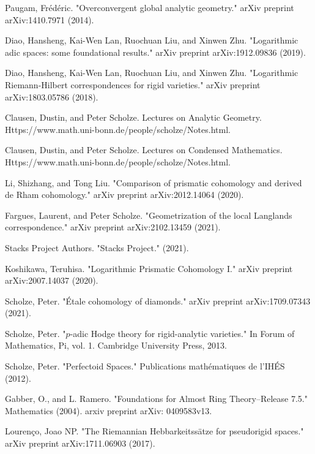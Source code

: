 \documentclass[11pt]{book}
\theoremstyle{definition}
\numberwithin{equation}{section}
\begin{document}
\begin{thebibliography}{10}
 Paugam, Fr\'ed\'eric. "Overconvergent global analytic geometry." arXiv preprint arXiv:1410.7971 (2014).


 Diao, Hansheng, Kai-Wen Lan, Ruochuan Liu, and Xinwen Zhu. "Logarithmic adic spaces: some foundational results." arXiv preprint arXiv:1912.09836 (2019).

 Diao, Hansheng, Kai-Wen Lan, Ruochuan Liu, and Xinwen Zhu. "Logarithmic Riemann-Hilbert correspondences for rigid varieties." arXiv preprint arXiv:1803.05786 (2018).


 Clausen, Dustin, and Peter Scholze. Lectures on Analytic Geometry. Https://www.math.uni-bonn.de/people/scholze/Notes.html.

 Clausen, Dustin, and Peter Scholze. Lectures on Condensed Mathematics. Https://www.math.uni-bonn.de/people/scholze/Notes.html.






 Li, Shizhang, and Tong Liu. "Comparison of prismatic cohomology and derived de Rham cohomology." arXiv preprint arXiv:2012.14064 (2020).


 Fargues, Laurent, and Peter Scholze. "Geometrization of the local Langlands correspondence." arXiv preprint arXiv:2102.13459 (2021).


 Stacks Project Authors. "Stacks Project." (2021).


 Koshikawa, Teruhisa. "Logarithmic Prismatic Cohomology I." arXiv preprint arXiv:2007.14037 (2020).


 Scholze, Peter. "\'Etale cohomology of diamonds." arXiv preprint arXiv:1709.07343 (2021).

 Scholze, Peter. "$ p $-adic Hodge theory for rigid-analytic varieties." In Forum of Mathematics, Pi, vol. 1. Cambridge University Press, 2013.

 Scholze, Peter. "Perfectoid Spaces." Publications math\'ematiques de l'IH\'ES (2012).

 Gabber, O., and  L. Ramero. "Foundations for Almost Ring Theory--Release 7.5." Mathematics (2004). arxiv preprint arXiv: 0409583v13.




 Louren\c{c}o, Joao NP. "The Riemannian Hebbarkeitss\"atze for pseudorigid spaces." arXiv preprint arXiv:1711.06903 (2017).



\end{thebibliography}
\end{document}
